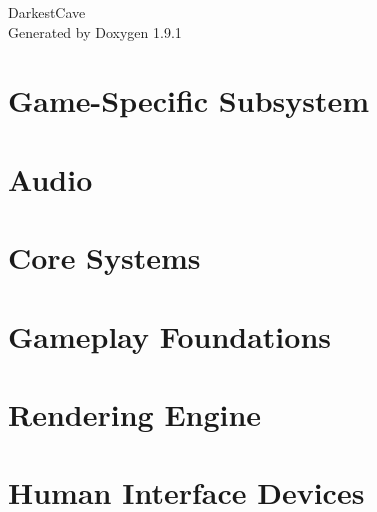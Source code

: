 \let\mypdfximage\pdfximage\def\pdfximage{\immediate\mypdfximage}\documentclass[twoside]{book}
\newcommand{\+}{\discretionary{\mbox{\scriptsize$\hookleftarrow$}}{}{}}
\newcommand{\clearemptydoublepage}{%
  \newpage{\pagestyle{empty}\cleardoublepage}%
}
\begin{document}
\raggedbottom

\hypersetup{pageanchor=false,
             bookmarksnumbered=true,
             pdfencoding=unicode
            }
\begin{titlepage}
\vspace*{7cm}
\begin{center}%
{\Large Darkest\+Cave }\\
\vspace*{1cm}
{\large Generated by Doxygen 1.9.1}\\
\end{center}
\end{titlepage}
\clearemptydoublepage
{}
\tableofcontents
\clearemptydoublepage
{}
\hypersetup{pageanchor=true}

\chapter{Game-\/\+Specific Subsystem}
\label{md__cave_engine__a_i__r_e_a_d_m_e}

\chapter{Audio}
\label{md__cave_engine__audio__r_e_a_d_m_e}

\chapter{Core Systems}
\label{md__cave_engine__core__r_e_a_d_m_e}

\chapter{Gameplay Foundations}
\label{md__cave_engine__gameplay__r_e_a_d_m_e}

\chapter{Rendering Engine}
\label{md__cave_engine__graphics__r_e_a_d_m_e}

\chapter{Human Interface Devices}
\label{md__cave_engine__h_i_d__r_e_a_d_m_e}

\end{document}

